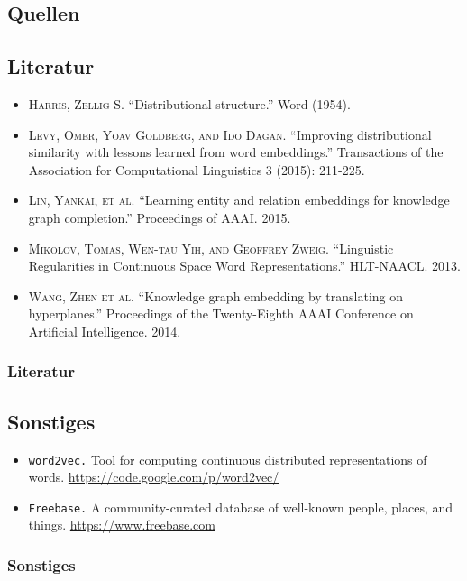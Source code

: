\documentclass[10pt,xcolor={usenames,dvipsnames,svgnames,table}]{beamer}
\begin{document}
\begin{frame}
	\section{Quellen}
	\subsection{Literatur}
		\begin{itemize}
			\item \textsc{Harris, Zellig S.} ``Distributional structure.'' Word (1954).
			\item \textsc{Levy, Omer, Yoav Goldberg, and Ido Dagan.} ``Improving distributional similarity with lessons learned from word embeddings.'' Transactions of the Association for Computational Linguistics 3 (2015): 211-225.
			\item \textsc{Lin, Yankai, et al.} ``Learning entity and relation embeddings for knowledge graph completion.'' Proceedings of AAAI. 2015.
			\item \textsc{Mikolov, Tomas, Wen-tau Yih, and Geoffrey Zweig.} ``Linguistic Regularities in Continuous Space Word Representations.'' HLT-NAACL. 2013.
			\item \textsc{Wang, Zhen et al.} ``Knowledge graph embedding by translating on hyperplanes.'' Proceedings of the Twenty-Eighth AAAI Conference on Artificial Intelligence. 2014.
		\end{itemize}
	\frametitle{Literatur}
\end{frame}

\begin{frame}
	\subsection{Sonstiges}
		\begin{itemize}
			\item \texttt{word2vec.} Tool for computing continuous distributed representations of words. \url{https://code.google.com/p/word2vec/}
			\item \texttt{Freebase.} A community-curated database of well-known people, places, and things. \url{https://www.freebase.com}
		\end{itemize}
	\frametitle{Sonstiges}
\end{frame}
\end{document}
